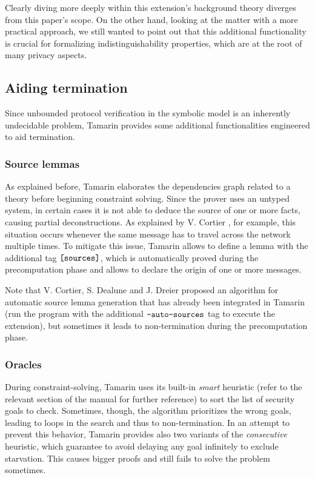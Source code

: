\documentclass{article}
\newcommand{\mono}[1]{\textrm{\tt #1}}
\begin{document}
Clearly diving more deeply within this extension's background theory diverges from this paper's scope. On the other hand, looking at the matter with a more practical approach, we still wanted to point out that this additional functionality is crucial for formalizing indistinguishability properties, which are at the root of many privacy aspects. 

\subsection{Aiding termination}

Since unbounded protocol verification in the symbolic model is an inherently undecidable problem, Tamarin provides some additional functionalities engineered to aid termination.

\subsubsection{Source lemmas}

As explained before, Tamarin elaborates the dependencies graph related to a theory before beginning constraint solving. Since the prover uses an untyped system, in certain cases it is not able to deduce the source of one or more facts, causing partial deconstructions. As explained by V. Cortier \cite{autosources}, for example, this situation occurs whenever the same message has to travel across the network multiple times. To mitigate this issue, Tamarin allows to define a lemma with the additional tag $\mono{[sources]}$, which is automatically proved during the precomputation phase and allows to declare the origin of one or more messages.

Note that V. Cortier, S. Dealune and J. Dreier proposed an algorithm for automatic source lemma generation \cite{autosources} that has already been integrated in Tamarin (run the program with the additional $\mono{--auto-sources}$ tag to execute the extension), but sometimes it leads to non-termination during the precomputation phase.

\subsubsection{Oracles}

During constraint-solving, Tamarin uses its built-in \textit{smart} heuristic (refer to the relevant section of the manual \cite{tamarinManual} for further reference) to sort the list of security goals to check. Sometimes, though, the algorithm prioritizes the wrong goals, leading to loops in the search and thus to non-termination. In an attempt to prevent this behavior, Tamarin provides also two variants of the \textit{consecutive} heuristic, which guarantee to avoid delaying any goal infinitely to exclude starvation. This causes bigger proofs and still fails to solve the problem sometimes.
\end{document}
